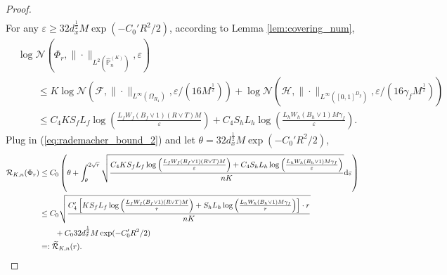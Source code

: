 \documentclass[11pt]{article}
\numberwithin{equation}{section}
\renewcommand{\P}{\mathbb{P}}
\renewcommand{\eqref}[1]{(\ref{#1})}
\begin{document}
\begin{proof}
\begin{equation}
\begin{aligned}
        \end{aligned}
    \end{equation}
    For any $\varepsilon\geq 32d_x^{\frac{1}{2}}M\exp(-C_0'R^2/2)$, according to Lemma \ref{lem:covering_num},
    \begin{equation}
        \begin{aligned}
            &\log\mathcal{N}(\Phi_r,\|\cdot\|_{L^2(\widehat{\P}_n^{(K)})},\varepsilon) \\
            &\qquad \leq K\log\mathcal{N}(\mathcal{F},\|\cdot\|_{L^\infty(\Omega_{R_1})},\varepsilon/(16M^{\frac{1}{2}})) + \log\mathcal{N}(\mathcal{H},\|\cdot\|_{L^\infty([0,1]^{D_y})},\varepsilon/(16\gamma_fM^{\frac{1}{2}})) \\
            &\qquad \leq C_4KS_fL_f\log\left(\frac{L_fW_f(B_f\vee 1)(R\vee T)M}{\varepsilon}\right)+C_4S_hL_h\log\left(\frac{L_hW_h(B_h\vee 1)M\gamma_f}{\varepsilon}\right).
        \end{aligned}
    \end{equation}
    Plug in \eqref{eq:rademacher_bound_2} and let $\theta=32d_x^{\frac{1}{2}}M\exp(-C_0'R^2/2)$,
    \begin{equation}
        \begin{aligned}
            \mathcal{R}_{K,n}(\Phi_r)
            &\leq C_0\left(\theta+\int_\theta^{2\sqrt{r}}\sqrt{\frac{C_4KS_fL_f\log\left(\frac{L_fW_f(B_f\vee 1)(R\vee T)M}{\varepsilon}\right)+C_4S_hL_h\log\left(\frac{L_hW_h(B_h\vee 1)M\gamma_f}{\varepsilon}\right)}{nK}}\mathrm{d}\varepsilon\right) \\
            &\leq C_0\sqrt{\frac{C_4'\left[KS_fL_f\log\left(\frac{L_fW_f(B_f\vee 1)(R\vee T)M}{r}\right)+ S_hL_h\log\left(\frac{L_hW_h(B_h\vee 1)M\gamma_f}{r}\right)\right]\cdot r}{nK}} \\
            &\qquad + C_032d_x^{\frac{1}{2}}M\exp(-C_0'R^2/2) \\
            &=: \widetilde{\mathcal{R}}_{K,n}(r).
        \end{aligned}
    \end{equation}


\end{proof}
\end{document}
